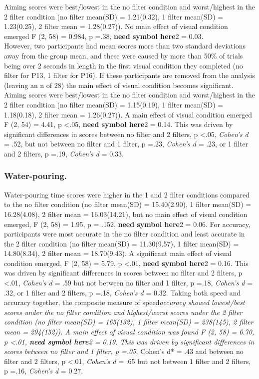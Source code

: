 \documentclass[
  english,
  man,floatsintext]{apa6}
\begin{document}
Aiming scores were best/lowest in the no filter condition and worst/highest in the 2 filter condition (no filter mean(SD) = 1.21(0.32), 1 filter mean(SD) = 1.23(0.25), 2 filter mean = 1.28(0.27)).
No main effect of visual condition emerged F (2, 58) = 0.984, p =.38, \textbf{need symbol here}2 = 0.03.\\
However, two participants had mean scores more than two standard deviations away from the group mean, and these were caused by more than 50\% of trials being over 2 seconds in length in the first visual condition they completed (no filter for P13, 1 filter for P16).
If these participants are removed from the analysis (leaving an n of 28) the main effect of visual condition becomes significant.
Aiming scores were best/lowest in the no filter condition and worst/highest in the 2 filter condition (no filter mean(SD) = 1.15(0.19), 1 filter mean(SD) = 1.18(0.18), 2 filter mean = 1.26(0.27)).
A main effect of visual condition emerged F (2, 54) = 4.41, p \textless{}.05, \textbf{need symbol here}2 = 0.14. This was driven by significant differences in scores between no filter and 2 filters, p \textless{}.05, \emph{Cohen's d} = .52, but not between no filter and 1 filter, p =.23, \emph{Cohen's d} = .23, or 1 filter and 2 filters, p =.19, \emph{Cohen's d} = 0.33.

\hypertarget{water-pouring.}{%
\subsubsection{Water-pouring.}\label{water-pouring.}}

Water-pouring time scores were higher in the 1 and 2 filter conditions compared to the no filter condition (no filter mean(SD) = 15.40(2.90), 1 filter mean(SD) = 16.28(4.08), 2 filter mean = 16.03(14.21), but no main effect of visual condition emerged, F (2, 58) = 1.95, p = .152, \textbf{need symbol here}2 = 0.06.
For accuracy, participants were most accurate in the no filter condition and least accurate in the 2 filter condition (no filter mean(SD) = 11.30(9.57), 1 filter mean(SD) = 14.80(8.34), 2 filter mean = 18.70(9.43).
A significant main effect of visual condition emerged, F (2, 58) = 5.79, p \textless{}.01, \textbf{need symbol here}2 = 0.16.
This was driven by significant differences in scores between no filter and 2 filters, p \textless{}.01, \emph{Cohen's d} = .59 but not between no filter and 1 filter, p =.18, \emph{Cohen's d} = .32, or 1 filter and 2 filters, p =.18, \emph{Cohen's d} = 0.32.
Taking both speed and accuracy together, the composite measure of speed\emph{accuracy showed lowest/best scores under the no filter condition and highest/worst scores under the 2 filter condition (no filter mean(SD) = 165(132), 1 filter mean(SD) = 238(145), 2 filter mean = 294(152)).
A main effect of visual condition was found F (2, 58) = 6.70, p \textless{}.01, \textbf{need symbol here}2 = 0.19.
This was driven by significant differences in scores between no filter and 1 filter, p =.05, }Cohen's d* = .43 and between no filter and 2 filters, p \textless{}.01, \emph{Cohen's d} = .65 but not between 1 filter and 2 filters, p =.16, \emph{Cohen's d} = 0.27.
\end{document}
